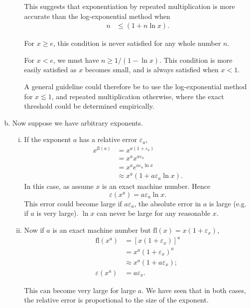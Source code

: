 \documentclass[12pt]{article}
\begin{document}
\begin{enumerate}[(a)]
\begin{enumerate}[(i)]
	This suggests that exponentiation by repeated multiplication is more accurate than the log-exponential method when
	\begin{equation*}
	\begin{aligned}
	n &\leq (1 + n\ln{x}).
	\end{aligned}
	\end{equation*}

	For $x \geq e$, this condition is never satisfied for any whole number $n$.

	For $x < e$, we must have $n \geq 1/(1 - \ln{x})$. This condition is more easily satisfied as $x$ becomes small, and is always satisfied when $x < 1$.

	A general guideline could therefore be to use the log-exponential method for $x \lesssim 1$, and repeated multiplication otherwise, where the exact threshold could be determined empirically.
	\end{enumerate}

\item 
Now suppose we have arbitrary exponents. 

	\begin{enumerate}[(i)]
	\item
	If the exponent $a$ has a relative error $\varepsilon_a$,
	\begin{equation*}
	\begin{aligned}
	x^{\mathrm{fl}(a)} &= x^{a(1+\varepsilon_a)} \\
	&= x^a x^{a \varepsilon_a} \\
	&= x^a e^{a\varepsilon_a\ln{x}} \\
	&\approx x^{a} \left(1 + a\varepsilon_a \ln{x}\right).
	\end{aligned}
	\end{equation*}
	In this case, as assume $x$ is an exact machine number. Hence
	\begin{equation*}
	\varepsilon(x^a) = a \varepsilon_a \ln{x}.
	\end{equation*}
	This error could become large if $a \varepsilon_a$, the absolute error in $a$ is large (e.g. if $a$ is very large). $\ln{x}$ can never be large for any reasonable $x$.


	\item 
	Now if $a$ is an exact machine number but $\mathrm{fl}(x) = x(1 + \varepsilon_x)$, 
	\begin{equation*}
	\begin{aligned}
	\mathrm{fl}(x^a) &= \left[x(1 + \varepsilon_x)\right]^a \\
	&= x^a (1 + \varepsilon_x)^a \\
	&\approx x^a (1 + a \varepsilon_x); \\
	\varepsilon(x^a) &= a\varepsilon_x.
	\end{aligned}
	\end{equation*}

	This can become very large for large $a$. We have seen that in both cases, the relative error is proportional to the size of the exponent.
	\end{enumerate}

\end{enumerate}
\end{document}
